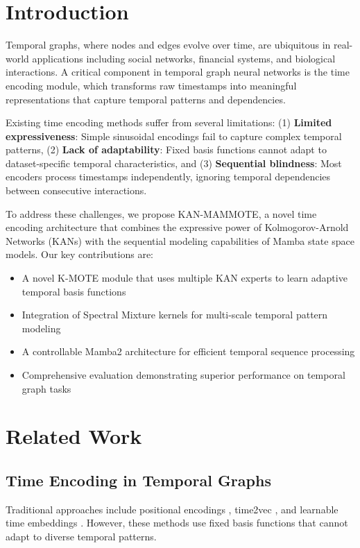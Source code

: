 \documentclass[conference]{IEEEtran}
\begin{document}
\section{Introduction}

Temporal graphs, where nodes and edges evolve over time, are ubiquitous in real-world applications including social networks, financial systems, and biological interactions. A critical component in temporal graph neural networks is the time encoding module, which transforms raw timestamps into meaningful representations that capture temporal patterns and dependencies.

Existing time encoding methods suffer from several limitations: (1) \textbf{Limited expressiveness}: Simple sinusoidal encodings fail to capture complex temporal patterns, (2) \textbf{Lack of adaptability}: Fixed basis functions cannot adapt to dataset-specific temporal characteristics, and (3) \textbf{Sequential blindness}: Most encoders process timestamps independently, ignoring temporal dependencies between consecutive interactions.

To address these challenges, we propose KAN-MAMMOTE, a novel time encoding architecture that combines the expressive power of Kolmogorov-Arnold Networks (KANs) with the sequential modeling capabilities of Mamba state space models. Our key contributions are:

\begin{itemize}
\item A novel K-MOTE module that uses multiple KAN experts to learn adaptive temporal basis functions
\item Integration of Spectral Mixture kernels for multi-scale temporal pattern modeling
\item A controllable Mamba2 architecture for efficient temporal sequence processing
\item Comprehensive evaluation demonstrating superior performance on temporal graph tasks
\end{itemize}

\section{Related Work}

\subsection{Time Encoding in Temporal Graphs}
Traditional approaches include positional encodings \cite{vaswani2017attention}, time2vec \cite{kazemi2019time2vec}, and learnable time embeddings \cite{xu2020inductive}. However, these methods use fixed basis functions that cannot adapt to diverse temporal patterns.
\end{document}
